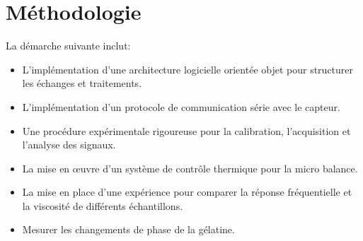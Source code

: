 \section{Méthodologie}

La démarche suivante inclut:
\begin{itemize}
    \item L’implémentation d’une architecture logicielle orientée objet pour structurer les échanges et traitements.
    \item L’implémentation d’un protocole de communication série avec le capteur.
    \item Une procédure expérimentale rigoureuse pour la calibration, l'acquisition et l’analyse des signaux.
    \item La mise en œuvre d’un système de contrôle thermique pour la micro balance.
    \item La mise en place d'une expérience pour comparer la réponse fréquentielle et la viscosité de différents échantillons.
    \item Mesurer les changements de phase de la gélatine. 
\end{itemize}






